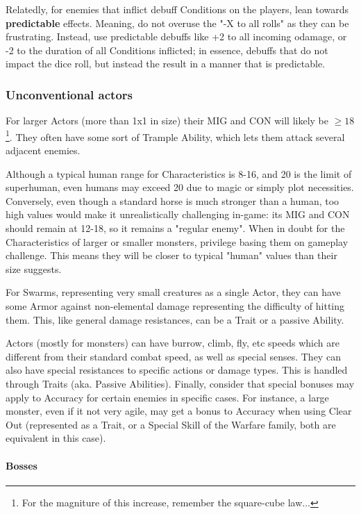 Relatedly, for enemies that inflict debuff Conditions on the players, lean towards \textbf{predictable} effects. Meaning, do not overuse the "-X to all rolls" as they can be frustrating. Instead, use predictable debuffs like +2 to all incoming odamage, or -2 to the duration of all Conditions inflicted; in essence, debuffs that do not impact the dice roll, but instead the result in a manner that is predictable.


\subsubsection{Unconventional actors}

For larger Actors (more than 1x1 in size) their MIG and CON will likely be $\geq18$\footnote{For the magniture of this increase, remember the square-cube law...}. They often have some sort of Trample Ability, which lets them attack several adjacent enemies.

Although a typical human range for Characteristics is 8-16, and 20 is the limit of superhuman, even humans may exceed 20 due to magic or simply plot necessities. Conversely, even though a standard horse is much stronger than a human, too high values would make it unrealistically challenging in-game: its MIG and CON should remain at 12-18, so it remains a "regular enemy". When in doubt for the Characteristics of larger or smaller monsters, privilege basing them on gameplay challenge. This means they will be closer to typical "human" values than their size suggests.

For Swarms, representing very small creatures as a single Actor, they can have some Armor against non-elemental damage representing the difficulty of hitting them. This, like general damage resistances, can be a Trait or a passive Ability.

Actors (mostly for monsters) can have burrow, climb, fly, etc speeds which are different from their standard combat speed, as well as special senses. They can also have special resistances to specific actions or damage types. This is handled through Traits (aka. Passive Abilities). Finally, consider that special bonuses may apply to Accuracy for certain enemies in specific cases. For instance, a large monster, even if it not very agile, may get a bonus to Accuracy when using Clear Out (represented as a Trait, or a Special Skill of the Warfare family, both are equivalent in this case).


\paragraph{Bosses}

